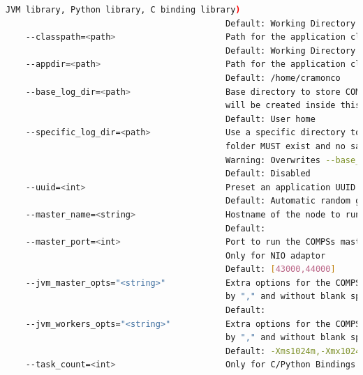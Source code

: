 \begin{lstlisting}[language=bash]
                                            JVM library, Python library, C binding library)                                 
                                            Default: Working Directory                                                                                                                  
    --classpath=<path>                      Path for the application classes / modules                                                                                                  
                                            Default: Working Directory                                                                                                                  
    --appdir=<path>                         Path for the application class folder.                                                                                                      
                                            Default: /home/cramonco
    --base_log_dir=<path>                   Base directory to store COMPSs log files (a .COMPSs/ folder
                                            will be created inside this location)
                                            Default: User home
    --specific_log_dir=<path>               Use a specific directory to store COMPSs log files (the 
                                            folder MUST exist and no sandbox is created)
                                            Warning: Overwrites --base_log_dir option
                                            Default: Disabled
    --uuid=<int>                            Preset an application UUID
                                            Default: Automatic random generation
    --master_name=<string>                  Hostname of the node to run the COMPSs master
                                            Default: 
    --master_port=<int>                     Port to run the COMPSs master communications.
                                            Only for NIO adaptor
                                            Default: [43000,44000]
    --jvm_master_opts="<string>"            Extra options for the COMPSs Master JVM. Each option separed 
                                            by "," and without blank spaces (Notice the quotes)
                                            Default: 
    --jvm_workers_opts="<string>"           Extra options for the COMPSs Workers JVMs. Each option separed 
                                            by "," and without blank spaces (Notice the quotes)
                                            Default: -Xms1024m,-Xmx1024m,-Xmn400m
    --task_count=<int>                      Only for C/Python Bindings. Maximum number of different

\end{lstlisting}
